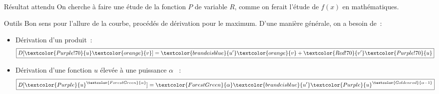 \documentclass[a4paper, 12pt, final, garamond]{book}
\begin{document}
\subsection{}
\begin{tcbraster}[raster columns=3, raster equal height=rows]
    \begin{NCprop}{Résultat attendu}
        On cherche à faire une étude de la fonction $P$ de variable $R$, comme
        on ferait l'étude de $f(x)$ en mathématiques.
    \end{NCprop}
    \begin{NCrapp}[raster multicolumn=2]{Outils}
        Bon sens pour l'allure de la courbe, procédés de dérivation pour le
        maximum. D'une manière générale, on a besoin de~:
        \begin{itemize}
            \item Dérivation d'un produit~:
                \begin{equation*}
                    \boxed{D[\textcolor{Purple!70}{u}
                        \textcolor{orange}{v}] =
                    \textcolor{brandeisblue}{u'}\textcolor{orange}{v} +
                \textcolor{Red!70}{v'}\textcolor{Purple!70}{u}}
                \end{equation*}
            \item Dérivation d'une fonction $u$ élevée à une puissance $\alpha$
               ~:
                \begin{equation*}
                    \boxed{D[\textcolor{Purple}{u}^
                        {\textcolor{ForestGreen}{\alpha}}] =
                    \textcolor{ForestGreen}{\alpha} \textcolor{brandeisblue}{u'}
                \textcolor{Purple}{u}^{\textcolor{Goldenrod}{\alpha-1}}}
                \end{equation*}
        \end{itemize}
    \end{NCrapp}
\end{tcbraster}
\vfill
\end{document}
